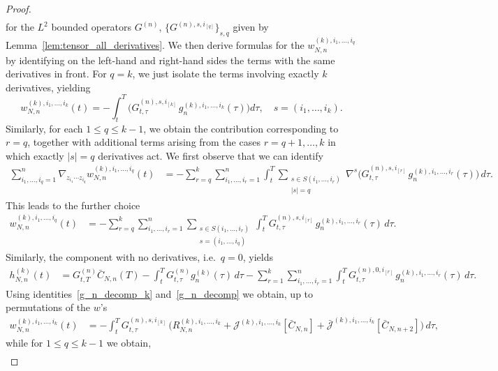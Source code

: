 \documentclass[pdflatex,sn-mathphys-num]{sn-jnl}
\theoremstyle{thmstyleone}%
\theoremstyle{thmstyletwo}%
\theoremstyle{thmstylethree}%
\begin{document}
\begin{proof}
\[\begin{split}
  \end{split}  
  \]
for the $L^2$ bounded operators $G^{(n)}$, $\{ G^{(n),s,i_{[q]}}\}_{s,q}$ given by Lemma~\ref{lem:tensor_all_derivatives}. We then derive formulas for the $w^{(k),i_1,\ldots,i_q}_{N,n}$ by identifying on the left-hand and right-hand sides the terms with the same derivatives in front. For $q=k$, we just isolate the terms involving exactly $k$ derivatives, yielding
\[
w^{(k),i_1,...,i_k}_{N,n}(t) =-\int_t^T
\Big(
G_{t,\tau}^{(n),s,i_{[k]}}\,
g_n^{(k),i_1,\dots,i_k}(\tau) 
\Big)d\tau,\quad s=(i_1,\ldots,i_k).
\]
Similarly, for each $1 \le q \le k-1$, we obtain the contribution corresponding
to $r=q$, together with additional terms arising from the cases
$r=q+1,\dots,k$ in which exactly $|s|=q$ derivatives act. We first observe that we can identify
\[
\begin{aligned}
\sum_{i_1,\dots,i_q=1}^n 
\nabla_{z_{i_1}\cdots z_{i_q}}
w^{(k),i_1,\dots,i_q}_{N,n}(t)
&=-
\sum_{r=q}^k\sum_{i_1,\dots,i_r=1}^n
\int_t^T
\sum_{\substack{s\in S(i_1,\dots,i_r)\\ |s|=q}}
\nabla^s\!\Big(
G_{t,\tau}^{(n),s,i_{[r]}}\,
g_n^{(k),i_1,\dots,i_r}(\tau)
\Big)\, d\tau.
\end{aligned}
\]
This leads to the further choice
\[
\begin{aligned}
w^{(k),i_1,\dots,i_q}_{N,n}(t)
&=-
\sum_{r=q}^k
\sum_{i_{1},\dots,i_r=1}^n
\sum_{\substack{s\in S(i_1,\dots,i_r)\\ s=(i_1,\ldots,i_q)}}
\int_t^T
G_{t,\tau}^{(n),s,i_{[r]}}\,
g_n^{(k),i_1,\dots,i_r}(\tau)\, d\tau .
\end{aligned}
\]
Similarly, the component with no derivatives, i.e.\ $q=0$, yields
\[
\begin{aligned}
h^{(k)}_{N,n}(t)
&=
G_{t,T}^{(n)} \bar{C}_{N,n}(T)
- \int_t^T G_{t,\tau}^{(n)} g_n^{(k)}(\tau)\, d\tau
- \sum_{r=1}^k
\sum_{i_1,\dots,i_r=1}^n
\int_t^T
G_{t,\tau}^{(n),0,i_{[r]}}\,
g_n^{(k),i_1,\dots,i_r}(\tau)\, d\tau .
\end{aligned}
\]
Using identities~\eqref{g_n_decomp_k} and~\eqref{g_n_decomp} we obtain, up to permutations of the \(w\)'s 
\[
\begin{aligned}
w^{(k),i_1,\dots,i_k}_{N,n}(t)
&=-
\int_t^TG_{t,\tau}^{(n),s,i_{[k]}}\,
\Bigg(
R^{(k),i_1,...,i_k}_{N,n}
+
\mathcal{J}^{(k),i_1,...,i_k}[\bar{C}_{N,n}]
+
\bar{\mathcal{J}}^{(k),i_1,\dots,i_k}[\bar{C}_{N,n+2}]
\Bigg) \,d\tau,
\end{aligned}
\]
while for $1\le q \le k-1$ we obtain, 
\[
\begin{aligned}

\end{aligned}\]
\end{proof}
\end{document}
